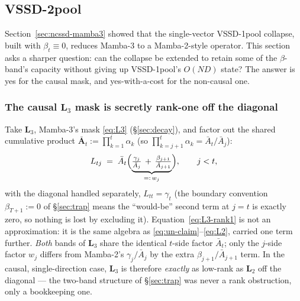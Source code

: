 \documentclass[11pt,a4paper]{article}
\begin{document}
\subsection{\texorpdfstring{VSSD-2pool}{VSSD-2pool}}
\label{sec:ncssd-beta}

Section~\ref{sec:ncssd-mamba3} showed that the single-vector VSSD-1pool
collapse, built with $\beta_t\equiv0$, reduces Mamba-3 to a
Mamba-2-style operator. This section asks a sharper question: can the
collapse be extended to retain some of the $\beta$-band's capacity
without giving up VSSD-1pool's $O(ND)$ state? The answer is yes for the
causal mask, and yes-with-a-cost for the non-causal one.

\subsubsection{The causal \texorpdfstring{$\bm{L}_3$}{L3} mask is secretly rank-one off the diagonal}

Take $\bm{L}_3$, Mamba-3's mask \eqref{eq:L3} (\S\ref{sec:decay}), and factor out the shared cumulative
product $\bar{\bm{A}}_t := \prod_{k=1}^{t}\alpha_k$ (so
$\prod_{k=j+1}^{t}\alpha_k = \bar A_t/\bar A_j$):
\begin{equation}\label{eq:L3-rank1}
  L_{tj} \;=\; \bar A_t\Bigl(\underbrace{\tfrac{\gamma_j}{\bar A_j}
  \,+\, \tfrac{\beta_{j+1}}{\bar A_{j+1}}}_{=:\,w_j}\Bigr),
  \qquad j < t,
\end{equation}
with the diagonal handled separately, $L_{tt}=\gamma_t$ (the boundary
convention $\beta_{T+1}:=0$ of \S\ref{sec:trap} means the ``would-be''
second term at $j=t$ is exactly zero, so nothing is lost by excluding
it). Equation~\eqref{eq:L3-rank1} is not an approximation: it is the
same algebra as \eqref{eq:un-claim}--\eqref{eq:L2}, carried one term
further. \emph{Both} bands of $\bm{L}_3$ share the identical $t$-side
factor $\bar A_t$; only the $j$-side factor $w_j$ differs from
Mamba-2's $\gamma_j/\bar A_j$ by the extra $\beta_{j+1}/\bar A_{j+1}$
term. In the causal, single-direction case, $\bm{L}_3$ is therefore
\emph{exactly} as low-rank as $\bm{L}_2$ off the diagonal --- the
two-band structure of \S\ref{sec:trap} was never a rank obstruction,
only a bookkeeping one.
\end{document}
